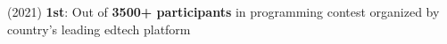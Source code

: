 (2021) \textbf{1st}{: Out of \textbf{3500+ participants} in programming contest organized by country's leading edtech platform} \\